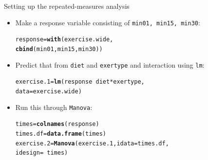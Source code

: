 \documentclass[unknownkeysallowed]{beamer}\usepackage[]{graphicx}\usepackage[]{color}
\makeatletter
\newcommand{\hlopt}[1]{\textcolor[rgb]{0,0,0}{#1}}%
\newcommand{\hlstd}[1]{\textcolor[rgb]{0.345,0.345,0.345}{#1}}%
\newcommand{\hlkwb}[1]{\textcolor[rgb]{0.69,0.353,0.396}{#1}}%
\newcommand{\hlkwc}[1]{\textcolor[rgb]{0.333,0.667,0.333}{#1}}%
\newcommand{\hlkwd}[1]{\textcolor[rgb]{0.737,0.353,0.396}{\textbf{#1}}}%
\newenvironment{kframe}{%
 \def\at@end@of@kframe{}%
 \ifinner\ifhmode%
  \def\at@end@of@kframe{\end{minipage}}%
  \begin{minipage}{\columnwidth}%
 \fi\fi%
 \def\FrameCommand##1{\hskip\@totalleftmargin \hskip-\fboxsep
 \colorbox{shadecolor}{##1}\hskip-\fboxsep
     \hskip-\linewidth \hskip-\@totalleftmargin \hskip\columnwidth}%
 \MakeFramed {\advance\hsize-\width
   \@totalleftmargin\z@ \linewidth\hsize
   \@setminipage}}%
 {\par\unskip\endMakeFramed%
 \at@end@of@kframe}
\newenvironment{knitrout}{}{} %
\makeatother
\begin{document}
\begin{frame}[fragile]{Setting up the repeated-measures analysis}
  
  \begin{itemize}
  \item Make a response variable consisting of \texttt{min01, min15, min30}:
\begin{knitrout}
\color{fgcolor}\begin{kframe}
\begin{alltt}
\hlstd{response}\hlkwb{=}\hlkwd{with}\hlstd{(exercise.wide,}
           \hlkwd{cbind}\hlstd{(min01, min15, min30))}
\end{alltt}
\end{kframe}
\end{knitrout}
\item Predict that from \texttt{diet} and \texttt{exertype} and
  interaction using \texttt{lm}:
\begin{knitrout}
\color{fgcolor}\begin{kframe}
\begin{alltt}
\hlstd{exercise.1}\hlkwb{=}\hlkwd{lm}\hlstd{(response}\hlopt{~}\hlstd{diet}\hlopt{*}\hlstd{exertype,}
  \hlkwc{data}\hlstd{=exercise.wide)}
\end{alltt}
\end{kframe}
\end{knitrout}

\item Run this through \texttt{Manova}:
\begin{knitrout}
\color{fgcolor}\begin{kframe}
\begin{alltt}
\hlstd{times}\hlkwb{=}\hlkwd{colnames}\hlstd{(response)}
\hlstd{times.df}\hlkwb{=}\hlkwd{data.frame}\hlstd{(times)}
\hlstd{exercise.2}\hlkwb{=}\hlkwd{Manova}\hlstd{(exercise.1,}\hlkwc{idata}\hlstd{=times.df,}
                  \hlkwc{idesign}\hlstd{=}\hlopt{~}\hlstd{times)}
\end{alltt}
\end{kframe}
\end{knitrout}
  \end{itemize}
  
\end{frame}
\end{document}
